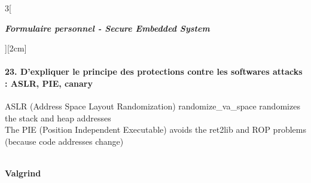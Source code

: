 \begin{multicols}{3}[\centerline{ \large\em \textbf{Formulaire personnel - Secure Embedded System}}][2cm]
\paragraph*{23. D’expliquer le principe des protections contre les softwares attacks : ASLR, PIE, canary\\}
ASLR (Address Space Layout Randomization) randomize\_va\_space randomizes
the stack and heap addresses\\
The PIE (Position Independent Executable) avoids the ret2lib and ROP problems
(because code addresses change)\\

\begin{minipage}{\linewidth}
	\centering
\end{minipage}\\

{\Large \textbf{Valgrind}}\\

\end{multicols}
